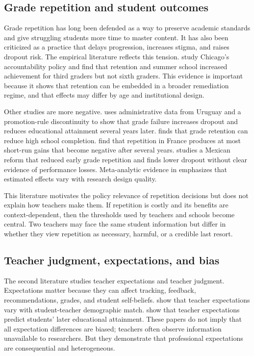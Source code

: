\documentclass[12pt,a4paper]{article}
\begin{document}
\subsection{Grade repetition and student outcomes}

Grade repetition has long been defended as a way to preserve academic standards and give struggling students more time to master content. It has also been criticized as a practice that delays progression, increases stigma, and raises dropout risk. The empirical literature reflects this tension. \citet{jacob2004} study Chicago's accountability policy and find that retention and summer school increased achievement for third graders but not sixth graders. This evidence is important because it shows that retention can be embedded in a broader remediation regime, and that effects may differ by age and institutional design.

Other studies are more negative. \citet{manacorda2012} uses administrative data from Uruguay and a promotion-rule discontinuity to show that grade failure increases dropout and reduces educational attainment several years later. \citet{jacob2009} finds that grade retention can reduce high school completion. \citet{alet2013} find that repetition in France produces at most short-run gains that become negative after several years. \citet{cabrera2022} studies a Mexican reform that reduced early grade repetition and finds lower dropout without clear evidence of performance losses. Meta-analytic evidence in \citet{allen2009} emphasizes that estimated effects vary with research design quality.

This literature motivates the policy relevance of repetition decisions but does not explain how teachers make them. If repetition is costly and its benefits are context-dependent, then the thresholds used by teachers and schools become central. Two teachers may face the same student information but differ in whether they view repetition as necessary, harmful, or a credible last resort.

\subsection{Teacher judgment, expectations, and bias}

The second literature studies teacher expectations and teacher judgment. Expectations matter because they can affect tracking, feedback, recommendations, grades, and student self-beliefs. \citet{gershenson2016} show that teacher expectations vary with student-teacher demographic match. \citet{papageorge2020} show that teacher expectations predict students' later educational attainment. These papers do not imply that all expectation differences are biased; teachers often observe information unavailable to researchers. But they demonstrate that professional expectations are consequential and heterogeneous.
\end{document}
